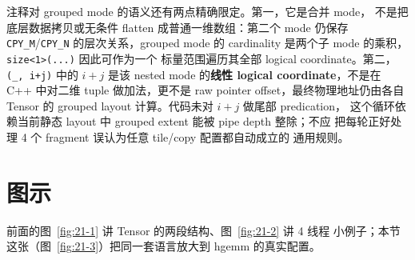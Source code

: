 注释对 grouped mode 的语义还有两点精确限定。第一，它是合并 mode，
不是把底层数据拷贝或无条件 flatten 成普通一维数组：第二个 mode
仍保存 \texttt{CPY\_M}/\texttt{CPY\_N} 的层次关系，grouped mode 的
cardinality 是两个子 mode 的乘积，\texttt{size<1>(...)} 因此可作为一个
标量范围遍历其全部 logical coordinate。第二，\texttt{(\_, i+j)} 中的
$i{+}j$ 是该 nested mode 的\textbf{线性 logical coordinate}，不是在 C++
中对二维 tuple 做加法，更不是 raw pointer offset，最终物理地址仍由各自
Tensor 的 grouped layout 计算。代码未对 $i{+}j$ 做尾部 predication，
这个循环依赖当前静态 layout 中 grouped extent 能被 pipe depth 整除；不应
把每轮正好处理 4 个 fragment 误认为任意 tile/copy 配置都自动成立的
通用规则。

\needspace{106mm}

\section{图示}

前面的图~\ref{fig:21-1} 讲 Tensor 的两段结构、图~\ref{fig:21-2} 讲 4 线程
小例子；本节这张（图~\ref{fig:21-3}）把同一套语言放大到 hgemm 的真实配置。

